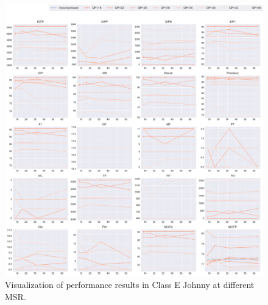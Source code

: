 \begin{figure}[!htbp]
\centering
\includegraphics[width=1.0\linewidth]{img/appendix/Johnny_all_multiplots_msr.pdf}
\caption[Visualization of performance results in Class E Johnny at different MSR]
{Visualization of performance results in Class E Johnny at different MSR.}
\label{fig:Johnny_all_msr}
\end{figure}




